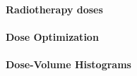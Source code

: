 \paragraph{Radiotherapy doses}

\paragraph{Dose Optimization}
%

\paragraph{Dose-Volume Histograms}
%


